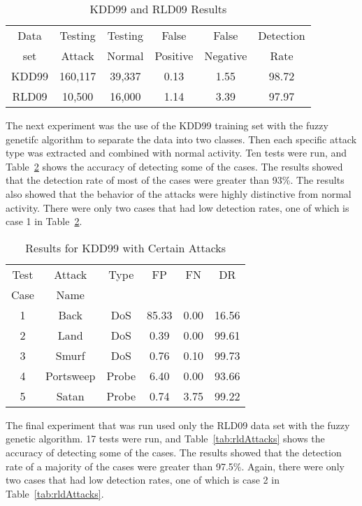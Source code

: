 \documentclass{sig-alternate}
\begin{document}
\begin{table}
\caption{KDD99 and RLD09 Results}
\begin{tabular}{|cccccc|} \hline
Data & Testing & Testing & False    & False    & Detection\\
set  & Attack  & Normal  & Positive & Negative & Rate\\ \hline
KDD99 & 160,117 & 39,337 & 0.13 & 1.55 & 98.72\\
RLD09 & 10,500 & 16,000 & 1.14 & 3.39 & 97.97\\
\hline\end{tabular}
\label{tab:bothSetsResults}
\end{table}

The next experiment was the use of the KDD99 training set with the fuzzy genetifc algorithm to separate the data into two classes. Then each specific attack type was extracted and combined with normal activity. Ten tests were run, and Table~\ref{tab:kddAttacks} shows the accuracy of detecting some of the cases. The results showed that the detection rate of most of the cases were greater than 93\%. The results also showed that the behavior of the attacks were highly distinctive from normal activity. There were only two cases that had low detection rates, one of which is case 1 in Table~\ref{tab:kddAttacks}.

\begin{table}
\caption{Results for KDD99 with Certain Attacks}
\begin{tabular}{|cccccc|} \hline
Test & Attack & Type & FP & FN & DR\\
Case & Name   &&&&\\ \hline
1 & Back & DoS & 85.33 & 0.00 & 16.56\\
2 & Land & DoS & 0.39 & 0.00 & 99.61\\
3 & Smurf & DoS & 0.76 & 0.10 & 99.73\\
4 & Portsweep & Probe & 6.40 & 0.00 & 93.66\\
5 & Satan & Probe & 0.74 & 3.75 & 99.22\\
\hline\end{tabular}
\label{tab:kddAttacks}
\end{table}

The final experiment that was run used only the RLD09 data set with the fuzzy genetic algorithm. 17 tests were run, and Table~\ref{tab:rldAttacks} shows the accuracy of detecting some of the cases. The results showed that the detection rate of a majority of the cases were greater than 97.5\%. Again, there were only two cases that had low detection rates, one of which is case 2 in Table~\ref{tab:rldAttacks}.
\end{document}
